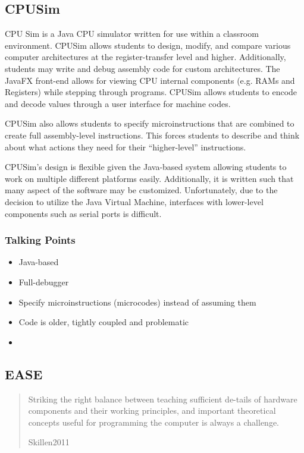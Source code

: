 \subsection{CPUSim}

\cite{Skrien2001}

CPU Sim is a Java CPU simulator written for use within a classroom environment. CPUSim allows students to design, modify, and compare various computer architectures at the register-transfer level and higher. Additionally, students may write and debug assembly code for custom architectures. The JavaFX front-end allows for viewing CPU internal components (e.g. RAMs and Registers) while stepping through programs. CPUSim allows students to encode and decode values through a user interface for machine codes. 

CPUSim also allows students to specify microinstructions that are combined to create full assembly-level instructions. This forces students to describe and think about what actions they need for their ``higher-level'' instructions. 

CPUSim's design is flexible given the Java-based system allowing students to work on multiple different platforms easily. Additionally, it is written such that many aspect of the software may be customized. Unfortunately, due to the decision to utilize the Java Virtual Machine, interfaces with lower-level components such as serial ports is difficult. 

\subsubsection{Talking Points}

\begin{itemize}
    \item Java-based
    \item Full-debugger
    \item Specify microinstructions (microcodes) instead of assuming them
    \item Code is older, tightly coupled and problematic
    \item 
\end{itemize}

\subsection{EASE}

\cite{Skillen2011}

\blockquote[Skillen2011]{Striking the right balance between teaching sufficient de-tails of hardware components and their working principles, and important theoretical concepts useful for programming the computer is always a challenge.}


